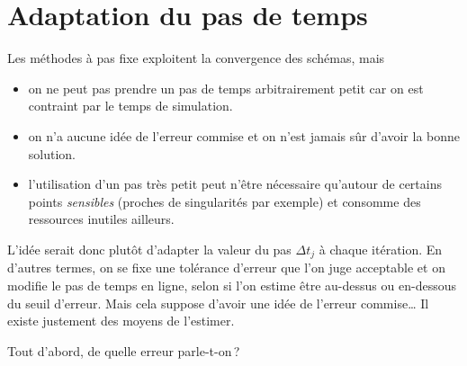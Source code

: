 \hypertarget{ed2-adaptation-du-pas-de-temps}{%
\section{Adaptation du pas de
temps}\label{ed2-adaptation-du-pas-de-temps}}

Les méthodes à pas fixe exploitent la convergence des schémas, mais

\begin{itemize}
\item
  on ne peut pas prendre un pas de temps arbitrairement petit car on est
  contraint par le temps de simulation.
\item
  on n'a aucune idée de l'erreur commise et on n'est jamais sûr d'avoir
  la bonne solution.
\item
  l'utilisation d'un pas très petit peut n'être nécessaire qu'autour de
  certains points \emph{sensibles} (proches de singularités par exemple)
  et consomme des ressources inutiles ailleurs.
\end{itemize}

L'idée serait donc plutôt d'adapter la valeur du pas \({\Delta t}_j\) à
chaque itération. En d'autres termes, on se fixe une tolérance d'erreur
que l'on juge acceptable et on modifie le pas de temps en ligne, selon
si l'on estime être au-dessus ou en-dessous du seuil d'erreur. Mais cela
suppose d'avoir une idée de l'erreur commise\ldots{} Il existe justement
des moyens de l'estimer.

Tout d'abord, de quelle erreur parle-t-on\,?

